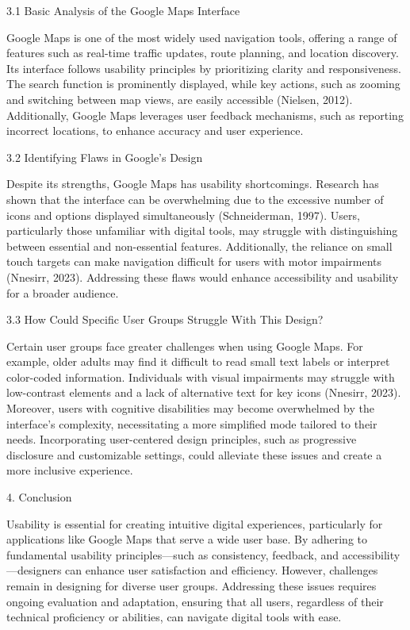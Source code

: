3.1 Basic Analysis of the Google Maps Interface

Google Maps is one of the most widely used navigation tools, offering a range of features such as real-time traffic updates, route planning, and location discovery. Its interface follows usability principles by prioritizing clarity and responsiveness. The search function is prominently displayed, while key actions, such as zooming and switching between map views, are easily accessible (Nielsen, 2012). Additionally, Google Maps leverages user feedback mechanisms, such as reporting incorrect locations, to enhance accuracy and user experience.

3.2 Identifying Flaws in Google's Design

Despite its strengths, Google Maps has usability shortcomings. Research has shown that the interface can be overwhelming due to the excessive number of icons and options displayed simultaneously (Schneiderman, 1997). Users, particularly those unfamiliar with digital tools, may struggle with distinguishing between essential and non-essential features. Additionally, the reliance on small touch targets can make navigation difficult for users with motor impairments (Nnesirr, 2023). Addressing these flaws would enhance accessibility and usability for a broader audience.

3.3 How Could Specific User Groups Struggle With This Design?

Certain user groups face greater challenges when using Google Maps. For example, older adults may find it difficult to read small text labels or interpret color-coded information. Individuals with visual impairments may struggle with low-contrast elements and a lack of alternative text for key icons (Nnesirr, 2023). Moreover, users with cognitive disabilities may become overwhelmed by the interface’s complexity, necessitating a more simplified mode tailored to their needs. Incorporating user-centered design principles, such as progressive disclosure and customizable settings, could alleviate these issues and create a more inclusive experience.

4. Conclusion

Usability is essential for creating intuitive digital experiences, particularly for applications like Google Maps that serve a wide user base. By adhering to fundamental usability principles—such as consistency, feedback, and accessibility—designers can enhance user satisfaction and efficiency. However, challenges remain in designing for diverse user groups. Addressing these issues requires ongoing evaluation and adaptation, ensuring that all users, regardless of their technical proficiency or abilities, can navigate digital tools with ease.


